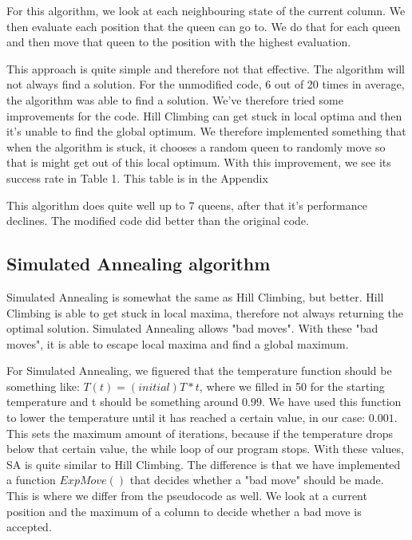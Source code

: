 \documentclass{article}
\begin{document}
	For this algorithm, we look at each neighbouring state of the current column. We then evaluate each position that the queen can go to. We do that for each queen and then move that queen to the position with the highest evaluation.
	
	This approach is quite simple and therefore not that effective. The algorithm will not always find a solution. For the unmodified code, 6 out of 20 times in average, the algorithm was able to find a solution. We've therefore tried some improvements for the code. Hill Climbing can get stuck in local optima and then it's unable to find the global optimum. We therefore implemented something that when the algorithm is stuck, it chooses a random queen to randomly move so that is might get out of this local optimum. With this improvement, we see its success rate in Table 1. This table is in the Appendix

	This algorithm does quite well up to 7 queens, after that it's performance declines. The modified code did better than the original code.
	


	
	\subsection{Simulated Annealing algorithm}
	Simulated Annealing is somewhat the same as Hill Climbing, but better. Hill Climbing is able to get stuck in local maxima, therefore not always returning the optimal solution. Simulated Annealing allows "bad moves". With these "bad moves", it is able to escape local maxima and find a global maximum. 
	
	For Simulated Annealing, we figuered that the temperature function should be something like: $ T(t) = (initial)T * t$, where we filled in 50 for the starting temperature and t should be something around $0.99$. We have used this function to lower the temperature until it has reached a certain value, in our case: $0.001$. This sets the maximum amount of iterations, because if the temperature drops below that certain value, the while loop of our program stops. With these values, SA is quite similar to Hill Climbing. The difference is that we have implemented a function $ExpMove()$ that decides whether a "bad move" should be made. This is where we differ from the pseudocode as well. We look at a current position and the maximum of a column to decide whether a bad move is accepted.
	
\end{document}
